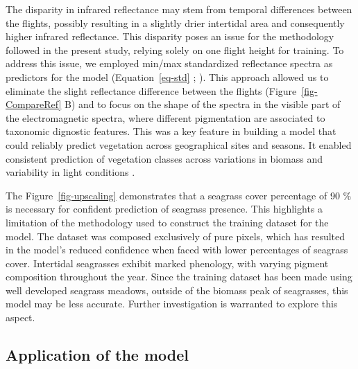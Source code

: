 \documentclass[
  number]{elsarticle}
\begin{document}
The disparity in infrared reflectance may stem from temporal differences
between the flights, possibly resulting in a slightly drier intertidal
area and consequently higher infrared reflectance. This disparity poses
an issue for the methodology followed in the present study, relying
solely on one flight height for training. To address this issue, we
employed min/max standardized reflectance spectra as predictors for the
model (Equation~\ref{eq-std} ; \citep{Cao2017}). This approach allowed
us to eliminate the slight reflectance difference between the flights
(Figure~\ref{fig-CompareRef} B) and to focus on the shape of the spectra
in the visible part of the electromagnetic spectra, where different
pigmentation are associated to taxonomic dignostic features. This was a
key feature in building a model that could reliably predict vegetation
across geographical sites and seasons. It enabled consistent prediction
of vegetation classes across variations in biomass and variability in
light conditions \citetext{\citealp[ ]{fyfe2003spatial}; \citealp[
]{COSTA2021107018}; \citealp{piaser2023impact}}.

The Figure~\ref{fig-upscaling} demonstrates that a seagrass cover
percentage of 90 \% is necessary for confident prediction of seagrass
presence. This highlights a limitation of the methodology used to
construct the training dataset for the model. The dataset was composed
exclusively of pure pixels, which has resulted in the model's reduced
confidence when faced with lower percentages of seagrass cover.
Intertidal seagrasses exhibit marked phenology, with varying pigment
composition throughout the year\citetext{\citealp[
]{bargain2013seasonal}; \citealp{legare2022remote}}. Since the training
dataset has been made using well developed seagrass meadows, outside of
the biomass peak of seagrasses, this model may be less accurate. Further
investigation is warranted to explore this aspect.

\subsection{Application of the model}\label{application-of-the-model}
\end{document}
